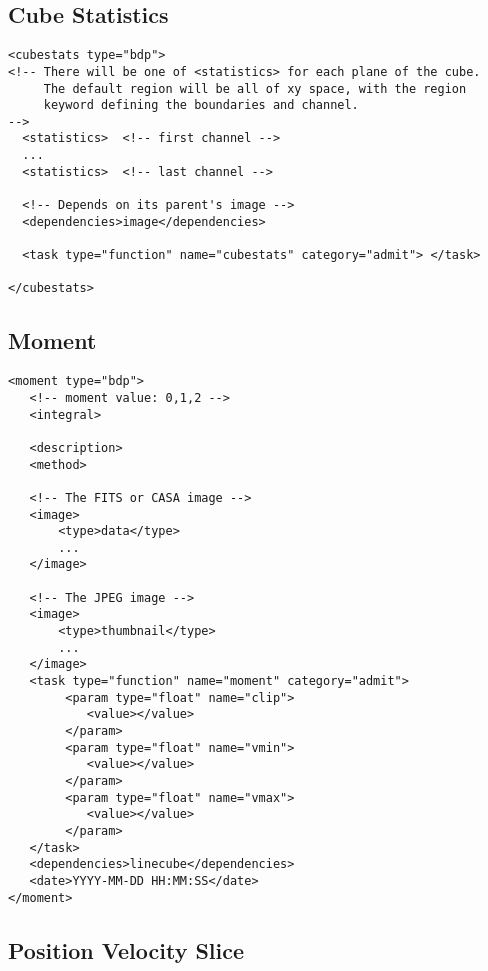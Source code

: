 \documentclass{article}
\begin{document}
\subsection{Cube Statistics}
\footnotesize
\begin{verbatim}
<cubestats type="bdp">
<!-- There will be one of <statistics> for each plane of the cube. 
     The default region will be all of xy space, with the region 
     keyword defining the boundaries and channel. 
-->
  <statistics>  <!-- first channel -->
  ...
  <statistics>  <!-- last channel -->

  <!-- Depends on its parent's image -->
  <dependencies>image</dependencies>

  <task type="function" name="cubestats" category="admit"> </task>

</cubestats>
\end{verbatim}

\subsection{Moment}
\footnotesize
\begin{verbatim}
<moment type="bdp">
   <!-- moment value: 0,1,2 -->
   <integral>          

   <description>
   <method>

   <!-- The FITS or CASA image -->
   <image> 
       <type>data</type>
       ...
   </image>  

   <!-- The JPEG image -->
   <image> 
       <type>thumbnail</type>
       ...
   </image>  
   <task type="function" name="moment" category="admit">
        <param type="float" name="clip">
           <value></value>
        </param>
        <param type="float" name="vmin">
           <value></value>
        </param>
        <param type="float" name="vmax">
           <value></value>
        </param>
   </task>
   <dependencies>linecube</dependencies>
   <date>YYYY-MM-DD HH:MM:SS</date>
</moment>
\end{verbatim}

\subsection{Position Velocity Slice}
\footnotesize
\begin{verbatim}
\end{verbatim}
\end{document}

